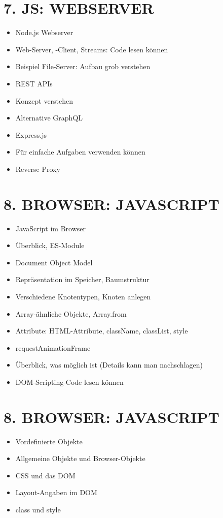 \documentclass[10pt]{article}
\begin{document}
\section*{7. JS: WEBSERVER}
\begin{itemize}
  \item Node.js Webserver
  \item Web-Server, -Client, Streams: Code lesen können
  \item Beispiel File-Server: Aufbau grob verstehen
  \item REST APIs
  \item Konzept verstehen
  \item Alternative GraphQL
  \item Express.js
  \item Für einfache Aufgaben verwenden können
  \item Reverse Proxy
\end{itemize}

\section*{8. BROWSER: JAVASCRIPT}
\begin{itemize}
  \item JavaScript im Browser
  \item Überblick, ES-Module
  \item Document Object Model
  \item Repräsentation im Speicher, Baumstruktur
  \item Verschiedene Knotentypen, Knoten anlegen
  \item Array-ähnliche Objekte, Array.from
  \item Attribute: HTML-Attribute, className, classList, style
  \item requestAnimationFrame
  \item Überblick, was möglich ist (Details kann man nachschlagen)
  \item DOM-Scripting-Code lesen können
\end{itemize}

\section*{8. BROWSER: JAVASCRIPT}
\begin{itemize}
  \item Vordefinierte Objekte
  \item Allgemeine Objekte und Browser-Objekte
  \item CSS und das DOM
  \item Layout-Angaben im DOM
  \item class und style
\end{itemize}
\end{document}
